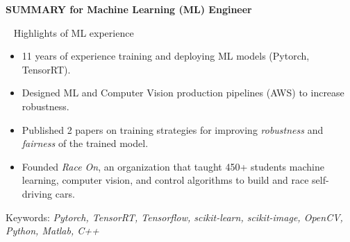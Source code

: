 \documentclass[11pt]{article}
\newcommand{\checkthis}{{\small \faIcon{star}}}
\begin{document}
\begin{tcolorbox}[enhanced, boxrule=0.5pt, colback=white, top=2mm, bottom=1mm, right=4mm, left=4mm, arc=0mm, leftrule=0mm, rightrule=0mm]
    {\large 
    \textbf{\Large SUMMARY for Machine Learning (ML) Engineer }
    \vspace{-8mm}
    \begin{flushright}
    \checkthis~\!\! \small Highlights of ML experience
    \end{flushright}
    \begin{itemize}[left=0pt]
    \item 11 years of experience training and deploying ML models (Pytorch, TensorRT).
    \item Designed ML and Computer Vision production pipelines (AWS) to increase robustness.
    \item Published 2 papers on training strategies for improving \textit{robustness} and \textit{fairness} of the trained model.
    \item Founded \textit{Race On}, an organization that taught 450+ students machine learning, computer vision, and control algorithms to build and race self-driving cars.
    \end{itemize}
    \vspace{-2mm}
    {\normalsize Keywords: \textit{Pytorch, TensorRT, Tensorflow, scikit-learn, scikit-image, OpenCV, Python, Matlab, C++}}
    
       
    }


\end{tcolorbox}
\end{document}
